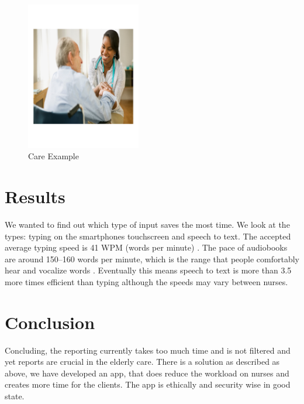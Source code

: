 \documentclass{article}
\begin{document}
\begin{figure}
\centering
\includegraphics[width = 50mm]{care.pdf}
\caption{Care Example}
\label{fig:Care Example}
\end{figure}

\section{Results}
We wanted to find out which type of input saves the most time. We look at the types: typing on the smartphones touchscreen and speech to text. The accepted average typing speed is 41 WPM (words per minute) \cite{5}. The pace of audiobooks are around 150–160 words per minute, which is the range that people comfortably hear and vocalize words \cite{6}. Eventually this means speech to text is more than 3.5 more times efficient than typing although the speeds may vary between nurses.

\section {Conclusion}
Concluding, the reporting currently takes too much time and is not filtered and yet reports are crucial in the elderly care. There is a solution as described as above, we have developed an app, that does reduce the workload on nurses and creates more time for the clients. The app is ethically and security wise in good state.

	\newpage


\end{document}
